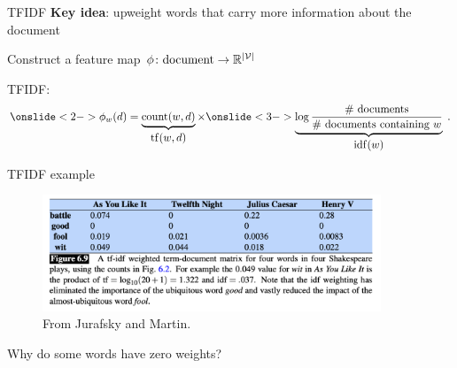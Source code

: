 \documentclass[usenames,dvipsnames,notes,11pt,aspectratio=169]{beamer}
\newcommand{\pdfnote}[1]{}
\begin{document}
\begin{frame}
    {TFIDF}
    \textbf{Key idea}: upweight words that carry more information about the document
    \pause

    Construct a feature map $\phi\colon \text{document} \rightarrow \mathbb{R}^{|\mathcal{V}|}$

    TFIDF:\\
    $$
    \onslide<2->{
        \phi_w(d) = \underbrace{\text{count}(w, d)}_{\textstyle \mathrm{tf}(w, d)} \times 
    }
    \onslide<3->{
        \underbrace{\log \frac{\text{\# documents}}{\textstyle\text{\# documents containing $w$}}}_{\textstyle \mathrm{idf}(w)}
    \;.
    }
    $$

    \begin{itemize}
    \end{itemize}
\end{frame}

\begin{frame}
    {TFIDF example}
    \begin{figure}
        \includegraphics[width=0.9\textwidth]{figures/tfidf}
        \caption{From Jurafsky and Martin.}
    \end{figure}

    Why do some words have zero weights?
\end{frame}

%
%
\end{document}
